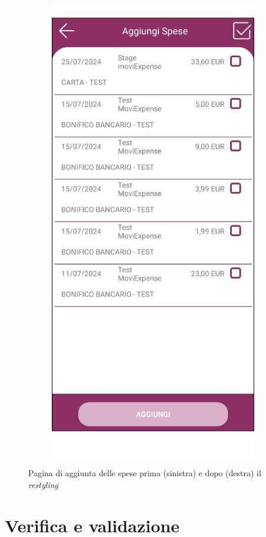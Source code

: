 \begin{figure}[H]
\begin{subfigure}{.5\textwidth}
        \includegraphics[width=.7\columnwidth]{images/screenshot/new/addSpese.png}\vspace{2mm}
    \end{subfigure}
    \caption{Pagina di aggiunta delle spese prima (sinistra) e dopo (destra) il \textit{restyling}}
\end{figure}

\section{Verifica e validazione}

